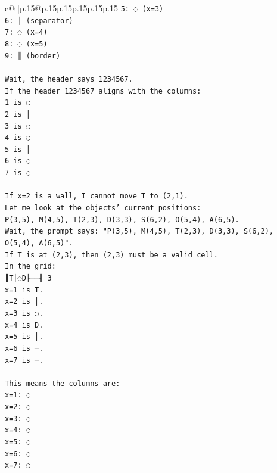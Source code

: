 \documentclass{article}
\begin{document}
{\begin{supertabular}{c@{$\;$}|p{.15\linewidth}@{}p{.15\linewidth}p{.15\linewidth}p{.15\linewidth}p{.15\linewidth}p{.15\linewidth}}
{{{\texttt{5: ◌ (x=3)} \\
\texttt{6: │ (separator)} \\
\texttt{7: ◌ (x=4)} \\
\texttt{8: ◌ (x=5)} \\
\texttt{9: ║ (border)} \\
\\ 
\texttt{Wait, the header says 1234567.} \\
\texttt{If the header 1234567 aligns with the columns:} \\
\texttt{1 is ◌} \\
\texttt{2 is │} \\
\texttt{3 is ◌} \\
\texttt{4 is ◌} \\
\texttt{5 is │} \\
\texttt{6 is ◌} \\
\texttt{7 is ◌} \\
\\ 
\texttt{If x=2 is a wall, I cannot move T to (2,1).} \\
\texttt{Let me look at the objects' current positions:} \\
\texttt{P(3,5), M(4,5), T(2,3), D(3,3), S(6,2), O(5,4), A(6,5).} \\
\texttt{Wait, the prompt says: "P(3,5), M(4,5), T(2,3), D(3,3), S(6,2), O(5,4), A(6,5)".} \\
\texttt{If T is at (2,3), then (2,3) must be a valid cell.} \\
\texttt{In the grid:} \\
\texttt{║T│◌D├──╢ 3} \\
\texttt{x=1 is T.} \\
\texttt{x=2 is │.} \\
\texttt{x=3 is ◌.} \\
\texttt{x=4 is D.} \\
\texttt{x=5 is │.} \\
\texttt{x=6 is ─.} \\
\texttt{x=7 is ─.} \\
\\ 
\texttt{This means the columns are:} \\
\texttt{x=1: ◌} \\
\texttt{x=2: ◌} \\
\texttt{x=3: ◌} \\
\texttt{x=4: ◌} \\
\texttt{x=5: ◌} \\
\texttt{x=6: ◌} \\
\texttt{x=7: ◌} \\
}}}
\end{supertabular}}
\end{document}
